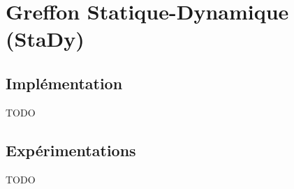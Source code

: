
\chapter{Greffon Statique-Dynamique (StaDy)}
\label{sec:stady}


\section{Implémentation}

TODO

\section{Expérimentations}

TODO
